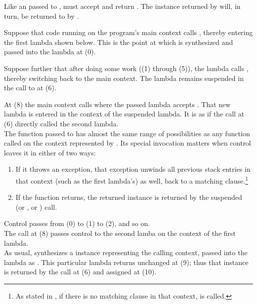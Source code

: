 Like an \entryfn passed to \callcc,  must accept
 and return \cont. The \cont instance returned
by  will, in turn, be returned to  by \resume.

Suppose that code running on the program's main context
calls , thereby entering the first lambda shown below. This
is the point at which  is synthesized and passed into the lambda at (0).

Suppose further that after doing some work ((1) through (5)), the lambda
calls , thereby switching back to the main context. The
lambda remains suspended in the call to  at (6).

At (8) the main context calls  where the passed
lambda accepts . That new lambda is entered in the
context of the suspended lambda. It is as if the  call at (6)
directly called the second lambda.\\

The function passed to \resumewith has almost the same range of possibilities
as any function called on the context represented by . Its special
invocation matters when control leaves it in either of two ways:

\begin{enumerate}
  \item If it throws an exception, that exception unwinds all previous stack
        entries in that context (such as the first lambda's) as well, back to
        a matching  clause.\footnote{As stated
        in , if there is no matching 
        clause in that context,  is called.}
  \item If the function returns, the returned \cont instance is returned by
        the suspended  (or \callcc, or \resumewith) call.
\end{enumerate}


Control passes from (0) to (1) to (2), and so on.\\

The  call at (8) passes control
to the second lamba on the context of the first lambda.\\

As usual, \resumewith synthesizes a \cont instance representing the calling
context, passed into the lambda as . This particular lambda
returns  unchanged at (9); thus that  instance is returned by
the \resume call at (6) and assigned at (10).\\

